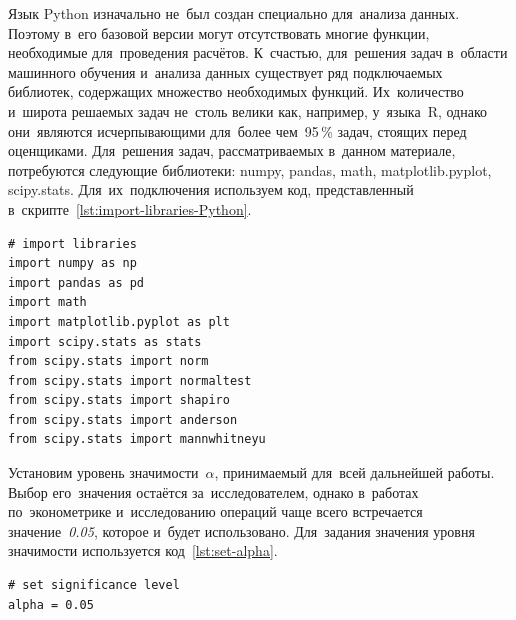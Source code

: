 \documentclass[]{scrreprt}
\begin{document}
Язык \foreignlanguage{english}{Python} изначально не~был создан специально для~анализа данных. Поэтому в~его базовой версии могут отсутствовать многие функции, необходимые для~проведения расчётов. К~счастью, для~решения задач в~области машинного обучения и~анализа данных существует ряд подключаемых библиотек, содержащих множество необходимых функций. Их~количество и~широта решаемых задач не~столь велики как, например, у~языка~R, однако они~являются исчерпывающими для~более чем~95\,\% задач, стоящих перед оценщиками. Для~решения задач, рассматриваемых в~данном материале, потребуются следующие библиотеки: \foreignlanguage{english}{numpy, pandas, math, matplotlib.pyplot, scipy.stats}. Для~их~подключения используем код, представленный в~скрипте~\ref{lst:import-libraries-Python}.
\begin{lstlisting}[float, caption = Подключение необходимых библиотек, firstnumber=1, label= lst:import-libraries-Python]
# import libraries
import numpy as np
import pandas as pd
import math
import matplotlib.pyplot as plt
import scipy.stats as stats
from scipy.stats import norm
from scipy.stats import normaltest
from scipy.stats import shapiro
from scipy.stats import anderson
from scipy.stats import mannwhitneyu
\end{lstlisting}
%

Установим уровень значимости~${\textstyle \alpha}$, принимаемый для~всей дальнейшей работы. Выбор его~значения остаётся за~исследователем, однако в~работах по~эконометрике и~исследованию операций чаще всего встречается значение~\textit{0.05}, которое и~будет использовано. Для~задания значения уровня значимости используется код~\ref{lst:set-alpha}.
%
\begin{lstlisting}[float, caption = Задание применяемого уровня значимости, firstnumber=1, label= lst:set-alpha]
# set significance level
alpha = 0.05
\end{lstlisting}
% 
\end{document}
